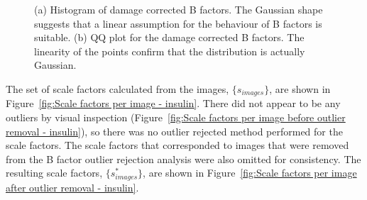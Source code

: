 \begin{figure}
\begin{subfigure}[b]{1.0\textwidth}
            \caption{}
            \label{fig:B factor QQ plot - insulin}
    \end{subfigure}
    \caption[Normality of calculated B factor distribution for the insulin dataset.]{(a) Histogram of damage corrected B factors.
    The Gaussian shape suggests that a linear assumption for the behaviour of B factors is suitable.
    (b) QQ plot for the damage corrected B factors.
    The linearity of the points confirm that the distribution is actually Gaussian.}
    \label{fig:Gaussian B factor plots - insulin}
\end{figure}

The set of scale factors calculated from the images, $\{ s_{images} \}$, are shown in Figure~\ref{fig:Scale factors per image - insulin}.
There did not appear to be any outliers by visual inspection (Figure~\ref{fig:Scale factors per image before outlier removal - insulin}), so there was no outlier rejected method performed for the scale factors.
The scale factors that corresponded to images that were removed from the B factor outlier rejection analysis were also omitted for consistency.
The resulting scale factors, $\{ s^{*}_{images} \}$, are shown in Figure~\ref{fig:Scale factors per image after outlier removal - insulin}.

